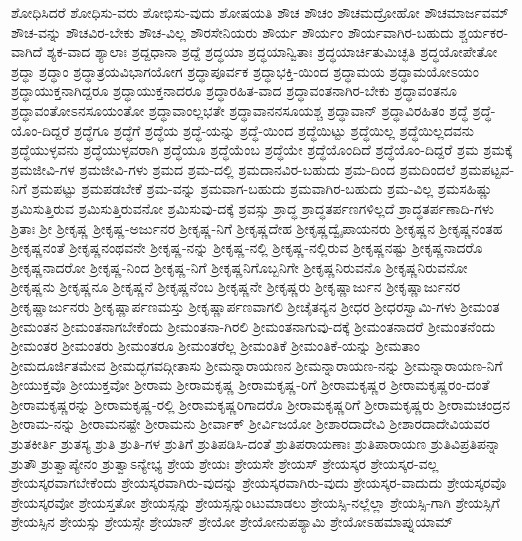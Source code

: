 {ಶೋಧಿಸಿದರೆ
ಶೋಧಿಸು-ವರು
ಶೋಭಿಸು-ವುದು
ಶೋಷಯತಿ
ಶೌಚ
ಶೌಚಂ
ಶೌಚಮದ್ರೋಹೋ
ಶೌಚಮಾರ್ಜವಮ್
ಶೌಚ-ವನ್ನು
ಶೌಚವಿರ-ಬೇಕು
ಶೌಚ-ವಿಲ್ಲ
ಶೌರಸೇನಿಯರು
ಶೌರ್ಯ
ಶೌರ್ಯಂ
ಶೌರ್ಯವಾಗಿರ-ಬಹುದು
ಶ್ಚರ್ಯಕರ-ವಾಗಿದೆ
ಶ್ಯಕ-ವಾದ
ಶ್ಯಾಲಾಃ
ಶ್ರದ್ದಧಾನಾ
ಶ್ರದ್ದೆ
ಶ್ರದ್ಧಯಾ
ಶ್ರದ್ಧಯಾನ್ವಿತಾಃ
ಶ್ರದ್ಧಯಾರ್ಚಿತುಮಿಚ್ಛತಿ
ಶ್ರದ್ಧಯೋಪೇತೋ
ಶ್ರದ್ಧಾ
ಶ್ರದ್ಧಾಂ
ಶ್ರದ್ಧಾತ್ರಯವಿಭಾಗಯೋಗ
ಶ್ರದ್ಧಾಪೂರ್ವಕ
ಶ್ರದ್ಧಾಭಕ್ತಿ-ಯಿಂದ
ಶ್ರದ್ಧಾಮಯ
ಶ್ರದ್ಧಾಮಯೋಽಯಂ
ಶ್ರದ್ಧಾಯುಕ್ತನಾಗಿದ್ದರೂ
ಶ್ರದ್ಧಾಯುಕ್ತನಾದರೂ
ಶ್ರದ್ಧಾರಹಿತ-ವಾದ
ಶ್ರದ್ಧಾವಂತನಾಗಿರ-ಬೇಕು
ಶ್ರದ್ಧಾವಂತನೂ
ಶ್ರದ್ಧಾವಂತೋಽನಸೂಯಂತೋ
ಶ್ರದ್ಧಾವಾಂಲ್ಲಭತೇ
ಶ್ರದ್ಧಾವಾನನಸೂಯಶ್ಚ
ಶ್ರದ್ಧಾವಾನ್
ಶ್ರದ್ಧಾವಿರಹಿತಂ
ಶ್ರದ್ಧೆ
ಶ್ರದ್ಧೆ-ಯೊಂ-ದಿದ್ದರೆ
ಶ್ರದ್ಧೆಗೂ
ಶ್ರದ್ಧೆಗೆ
ಶ್ರದ್ಧೆಯ
ಶ್ರದ್ಧೆ-ಯನ್ನು
ಶ್ರದ್ಧೆ-ಯಿಂದ
ಶ್ರದ್ಧೆಯಿಟ್ಟು
ಶ್ರದ್ಧೆಯಿಲ್ಲ
ಶ್ರದ್ಧೆಯಿಲ್ಲದವನು
ಶ್ರದ್ಧೆಯುಳ್ಳವನು
ಶ್ರದ್ಧೆಯುಳ್ಳವರಾಗಿ
ಶ್ರದ್ಧೆಯೂ
ಶ್ರದ್ಧೆಯೆಂಬ
ಶ್ರದ್ಧೆಯೇ
ಶ್ರದ್ಧೆಯೊಂದಿದೆ
ಶ್ರದ್ಧೆಯೊಂ-ದಿದ್ದರೆ
ಶ್ರಮ
ಶ್ರಮಕ್ಕೆ
ಶ್ರಮಜೀವಿ-ಗಳ
ಶ್ರಮಜೀವಿ-ಗಳು
ಶ್ರಮದ
ಶ್ರಮ-ದಲ್ಲಿ
ಶ್ರಮದಾನವಿರ-ಬಹುದು
ಶ್ರಮ-ದಿಂದ
ಶ್ರಮದಿಂದಲೆ
ಶ್ರಮಪಟ್ಟವ-ನಿಗೆ
ಶ್ರಮಪಟ್ಟು
ಶ್ರಮಪಡಬೇಕೆ
ಶ್ರಮ-ವನ್ನು
ಶ್ರಮವಾಗ-ಬಹುದು
ಶ್ರಮವಾಗಿರ-ಬಹುದು
ಶ್ರಮ-ವಿಲ್ಲ
ಶ್ರಮಸಹಿಷ್ಣು
ಶ್ರಮಿಸುತ್ತಿರುವ
ಶ್ರಮಿಸುತ್ತಿರುವನೋ
ಶ್ರಮಿಸುವು-ದಕ್ಕೆ
ಶ್ರವಸ್ಸು
ಶ್ರಾದ್ಧ
ಶ್ರಾದ್ಧತರ್ಪಣಗಳಿಲ್ಲದೆ
ಶ್ರಾದ್ಧತರ್ಪಣಾದಿ-ಗಳು
ಶ್ರಿತಾಃ
ಶ್ರೀ
ಶ್ರೀಕೃಷ್ಣ
ಶ್ರೀಕೃಷ್ಣ-ಅರ್ಜುನರ
ಶ್ರೀಕೃಷ್ಣ-ನಿಗೆ
ಶ್ರೀಕೃಷ್ಣದೇಹ
ಶ್ರೀಕೃಷ್ಣದ್ವೈಪಾಯನರು
ಶ್ರೀಕೃಷ್ಣನ
ಶ್ರೀಕೃಷ್ಣನಂತಹ
ಶ್ರೀಕೃಷ್ಣನಂತೆ
ಶ್ರೀಕೃಷ್ಣನಂಥವನೇ
ಶ್ರೀಕೃಷ್ಣ-ನನ್ನು
ಶ್ರೀಕೃಷ್ಣ-ನಲ್ಲಿ
ಶ್ರೀಕೃಷ್ಣ-ನಲ್ಲಿರುವ
ಶ್ರೀಕೃಷ್ಣನಷ್ಟು
ಶ್ರೀಕೃಷ್ಣನಾದರೊ
ಶ್ರೀಕೃಷ್ಣನಾದರೋ
ಶ್ರೀಕೃಷ್ಣ-ನಿಂದ
ಶ್ರೀಕೃಷ್ಣ-ನಿಗೆ
ಶ್ರೀಕೃಷ್ಣನಿಗೊಬ್ಬನಿಗೇ
ಶ್ರೀಕೃಷ್ಣನಿರುವನೊ
ಶ್ರೀಕೃಷ್ಣನಿರುವನೋ
ಶ್ರೀಕೃಷ್ಣನು
ಶ್ರೀಕೃಷ್ಣನೂ
ಶ್ರೀಕೃಷ್ಣನೆ
ಶ್ರೀಕೃಷ್ಣನೆಂಬ
ಶ್ರೀಕೃಷ್ಣನೇ
ಶ್ರೀಕೃಷ್ಣರು
ಶ್ರೀಕೃಷ್ಣಾರ್ಜುನ
ಶ್ರೀಕೃಷ್ಣಾರ್ಜುನರ
ಶ್ರೀಕೃಷ್ಣಾರ್ಜುನರು
ಶ್ರೀಕೃಷ್ಣಾರ್ಪಣಮಸ್ತು
ಶ್ರೀಕೃಷ್ಣಾರ್ಪಣವಾಗಲಿ
ಶ್ರೀಚೈತನ್ಯನ
ಶ್ರೀಧರ
ಶ್ರೀಧರಸ್ವಾಮಿ-ಗಳು
ಶ್ರೀಮಂತ
ಶ್ರೀಮಂತನ
ಶ್ರೀಮಂತನಾಗಬೇಕೆಂದು
ಶ್ರೀಮಂತನಾ-ಗಿರಲಿ
ಶ್ರೀಮಂತನಾಗುವು-ದಕ್ಕೆ
ಶ್ರೀಮಂತನಾದರೆ
ಶ್ರೀಮಂತನೆಂದು
ಶ್ರೀಮಂತರ
ಶ್ರೀಮಂತರು
ಶ್ರೀಮಂತರೂ
ಶ್ರೀಮಂತರೆಲ್ಲ
ಶ್ರೀಮಂತಿಕೆ
ಶ್ರೀಮಂತಿಕೆ-ಯನ್ನು
ಶ್ರೀಮತಾಂ
ಶ್ರೀಮದೂರ್ಜಿತಮೇವ
ಶ್ರೀಮದ್ಭಗವದ್ಗೀತಾಸು
ಶ್ರೀಮನ್ನಾರಾಯಣನ
ಶ್ರೀಮನ್ನಾರಾಯಣ-ನನ್ನು
ಶ್ರೀಮನ್ನಾರಾಯಣ-ನಿಗೆ
ಶ್ರೀಯುಕ್ತವೊ
ಶ್ರೀಯುಕ್ತವೋ
ಶ್ರೀರಾಮ
ಶ್ರೀರಾಮಕೃಷ್ಣ
ಶ್ರೀರಾಮಕೃಷ್ಣ-ರಿಗೆ
ಶ್ರೀರಾಮಕೃಷ್ಣರ
ಶ್ರೀರಾಮಕೃಷ್ಣರಂ-ದಂತೆ
ಶ್ರೀರಾಮಕೃಷ್ಣರನ್ನು
ಶ್ರೀರಾಮಕೃಷ್ಣ-ರಲ್ಲಿ
ಶ್ರೀರಾಮಕೃಷ್ಣರಿಗಾದರೊ
ಶ್ರೀರಾಮಕೃಷ್ಣರಿಗೆ
ಶ್ರೀರಾಮಕೃಷ್ಣರು
ಶ್ರೀರಾಮಚಂದ್ರನ
ಶ್ರೀರಾಮ-ನನ್ನು
ಶ್ರೀರಾಮನಷ್ಟೇ
ಶ್ರೀರಾಮನು
ಶ್ರೀರ್ವಾಕ್
ಶ್ರೀರ್ವಿಜಯೋ
ಶ್ರೀಶಾರದಾದೇವಿ
ಶ್ರೀಶಾರದಾದೇವಿಯವರ
ಶ್ರುತಕೀರ್ತಿ
ಶ್ರುತಸ್ಯ
ಶ್ರುತಿ
ಶ್ರುತಿ-ಗಳ
ಶ್ರುತಿಗೆ
ಶ್ರುತಿಪಡಿಸಿ-ದಂತೆ
ಶ್ರುತಿಪರಾಯಣಾಃ
ಶ್ರುತಿಪಾರಾಯಣ
ಶ್ರುತಿವಿಪ್ರತಿಪನ್ನಾ
ಶ್ರುತೌ
ಶ್ರುತ್ವಾಪ್ಯೇನಂ
ಶ್ರುತ್ವಾಽನ್ಯೇಭ್ಯ
ಶ್ರೇಯ
ಶ್ರೇಯಃ
ಶ್ರೇಯಸೇ
ಶ್ರೇಯಸ್
ಶ್ರೇಯಸ್ಕರ
ಶ್ರೇಯಸ್ಕರ-ವಲ್ಲ
ಶ್ರೇಯಸ್ಕರವಾಗಬೇಕೆಂದು
ಶ್ರೇಯಸ್ಕರವಾಗಿರು-ವುದನ್ನು
ಶ್ರೇಯಸ್ಕರವಾಗಿರು-ವುದು
ಶ್ರೇಯಸ್ಕರ-ವಾದುದು
ಶ್ರೇಯಸ್ಕರವೊ
ಶ್ರೇಯಸ್ಕರವೋ
ಶ್ರೇಯಸ್ತತೋ
ಶ್ರೇಯಸ್ಸನ್ನು
ಶ್ರೇಯಸ್ಸನ್ನುಂಟುಮಾಡಲು
ಶ್ರೇಯಸ್ಸಿ-ನಲ್ಲೆಲ್ಲಾ
ಶ್ರೇಯಸ್ಸಿ-ಗಾಗಿ
ಶ್ರೇಯಸ್ಸಿಗೆ
ಶ್ರೇಯಸ್ಸಿನ
ಶ್ರೇಯಸ್ಸು
ಶ್ರೇಯಸ್ಸೇ
ಶ್ರೇಯಾನ್
ಶ್ರೇಯೋ
ಶ್ರೇಯೋನುಪಶ್ಯಾಮಿ
ಶ್ರೇಯೋಽಹಮಾಪ್ನುಯಾಮ್
}
